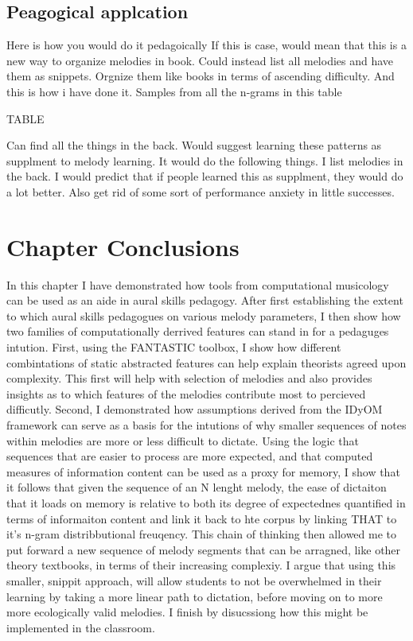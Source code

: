 \documentclass[]{book}
\begin{document}
\hypertarget{peagogical-applcation}{%
\subsection{Peagogical applcation}\label{peagogical-applcation}}

Here is how you would do it pedagoically
If this is case, would mean that this is a new way to organize melodies in book.
Could instead list all melodies and have them as snippets.
Orgnize them like books in terms of ascending difficulty.
And this is how i have done it.
Samples from all the n-grams in this table

TABLE

Can find all the things in the back.
Would suggest learning these patterns as supplment to melody learning.
It would do the following things.
I list melodies in the back.
I would predict that if people learned this as supplment, they would do a lot better.
Also get rid of some sort of performance anxiety in little successes.

\hypertarget{chapter-conclusions}{%
\section{Chapter Conclusions}\label{chapter-conclusions}}

In this chapter I have demonstrated how tools from computational musicology can be used as an aide in aural skills pedagogy.
After first establishing the extent to which aural skills pedagogues on various melody parameters, I then show how two families of computationally derrived features can stand in for a pedaguges intution.
First, using the FANTASTIC toolbox, I show how different combintations of static abstracted features can help explain theorists agreed upon complexity.
This first will help with selection of melodies and also provides insights as to which features of the melodies contribute most to percieved difficutly.
Second, I demonstrated how assumptions derived from the IDyOM framework can serve as a basis for the intutions of why smaller sequences of notes within melodies are more or less difficult to dictate.
Using the logic that sequences that are easier to process are more expected, and that computed measures of information content can be used as a proxy for memory, I show that it follows that given the sequence of an N lenght melody, the ease of dictaiton that it loads on memory is relative to both its degree of expectednes quantified in terms of informaiton content and link it back to hte corpus by linking THAT to it's n-gram distribbutional freuqency.
This chain of thinking then allowed me to put forward a new sequence of melody segments that can be arragned, like other theory textbooks, in terms of their increasing complexiy.
I argue that using this smaller, snippit approach, will allow students to not be overwhelmed in their learning by taking a more linear path to dictation, before moving on to more more ecologically valid melodies.
I finish by disucssiong how this might be implemented in the classroom.
\end{document}
